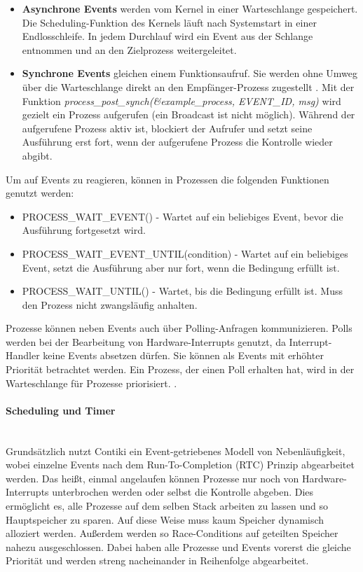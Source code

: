 \begin{itemize}
\item \textbf{Asynchrone Events} werden vom Kernel in einer Warteschlange gespeichert. Die Scheduling-Funktion des Kernels läuft nach Systemstart in einer Endlosschleife. In jedem Durchlauf wird ein Event aus der Schlange entnommen und an den Zielprozess weitergeleitet.
\item \textbf{Synchrone Events} gleichen einem Funktionsaufruf.
Sie werden ohne Umweg über die Warteschlange direkt an den Empfänger-Prozess
zugestellt \cite{Contiki:2014:Online}.  Mit der Funktion \textit{process\_post\_synch(\&example\_process, EVENT\_ID, msg)} wird gezielt ein Prozess aufgerufen (ein Broadcast ist nicht möglich). Während der aufgerufene Prozess aktiv ist, blockiert der Aufrufer und setzt seine Ausführung erst fort, wenn der aufgerufene Prozess die Kontrolle wieder abgibt.
\end{itemize}

Um auf Events zu reagieren, können in Prozessen die folgenden Funktionen genutzt werden:

\begin{itemize}
\item PROCESS\_WAIT\_EVENT() - Wartet auf ein beliebiges Event, bevor die Ausf\"{u}hrung fortgesetzt wird.
\item PROCESS\_WAIT\_EVENT\_UNTIL(condition) - Wartet auf ein beliebiges Event, setzt die Ausf\"{u}hrung aber nur fort, wenn die Bedingung erf\"{u}llt ist.
\item PROCESS\_WAIT\_UNTIL() - Wartet, bis die Bedingung erf\"ullt ist. Muss den Prozess nicht zwangsl\"{a}ufig anhalten.
\end{itemize}

Prozesse können neben Events auch über Polling-Anfragen kommunizieren. Polls werden bei der Bearbeitung von Hardware-Interrupts genutzt, da Interrupt-Handler keine Events absetzen dürfen. Sie können als Events mit erhöhter Priorität betrachtet werden. Ein Prozess, der einen Poll erhalten hat, wird in der Warteschlange für Prozesse priorisiert. \cite{Contiki:2014:Online, Walter:2010}.

\paragraph{Scheduling und Timer}\mbox{}\\
Grundsätzlich nutzt Contiki ein Event-getriebenes Modell von Nebenläufigkeit, wobei einzelne Events nach dem Run-To-Completion (RTC) Prinzip abgearbeitet werden. Das heißt, einmal angelaufen können Prozesse nur noch von Hardware-Interrupts unterbrochen werden oder selbst die Kontrolle abgeben. Dies ermöglicht es, alle Prozesse auf dem selben Stack arbeiten zu lassen und so Hauptspeicher zu sparen. Auf diese Weise muss kaum Speicher dynamisch alloziert werden. Außerdem werden so Race-Conditions auf geteilten Speicher nahezu ausgeschlossen. Dabei haben alle Prozesse und Events vorerst die gleiche Priorität und werden streng nacheinander in Reihenfolge abgearbeitet.

